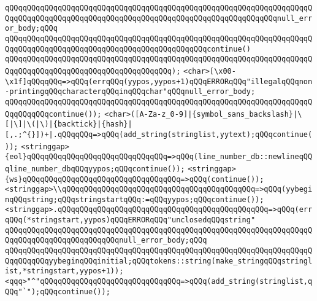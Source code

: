 \verb|qQQqqQQqqQQqqQQqqQQqqQQqqQQqqQQqqQQqqQQqqQQqqQQqqQQqqQQqqQQqqQQqqQQqqQQqqQQqqQQqqQQqqQQqqQQqqQQqqQQqqQQqqQQqqQQqqQQqqQQqqQQqqQQqqQQqnull_error_body;qQQq|\newline
\verb|qQQqqQQqqQQqqQQqqQQqqQQqqQQqqQQqqQQqqQQqqQQqqQQqqQQqqQQqqQQqqQQqqQQqqQQqqQQqqQQqqQQqqQQqqQQqqQQqqQQqqQQqqQQqqQQqqQQqcontinue()|\newline
\verb|qQQqqQQqqQQqqQQqqQQqqQQqqQQqqQQqqQQqqQQqqQQqqQQqqQQqqQQqqQQqqQQqqQQqqQQqqQQqqQQqqQQqqQQqqQQqqQQqqQQqqQQqqQQq);|\newline
\newline
\newline
\verb|<char>[\x00-\x1f]qQQqqQQq=>qQQq(errqQQq(yypos,yypos+1)qQQqERRORqQQq"illegalqQQqnon-printingqQQqcharacterqQQqinqQQqchar"qQQqnull_error_body;|\newline
\verb|qQQqqQQqqQQqqQQqqQQqqQQqqQQqqQQqqQQqqQQqqQQqqQQqqQQqqQQqqQQqqQQqqQQqqQQqqQQqqQQqcontinue());|\newline
\verb|<char>([A-Za-z_0-9]|\verb#|{symbol_sans_backslash}|\[|\]|\(|\)|{backtick}|{hash}|[,.;^{}])+|.qQQqqQQq=>qQQq(add_string(stringlist,yytext);qQQqcontinue());#\newline
\newline
\newline
\verb|<stringgap>{eol}qQQqqQQqqQQqqQQqqQQqqQQqqQQqqQQq=>qQQq(line_number_db::newlineqQQqline_number_dbqQQqyypos;qQQqcontinue());|\newline
\verb|<stringgap>{ws}qQQqqQQqqQQqqQQqqQQqqQQqqQQqqQQqqQQq=>qQQq(continue());|\newline
\verb|<stringgap>\\qQQqqQQqqQQqqQQqqQQqqQQqqQQqqQQqqQQqqQQqqQQq=>qQQq(yybeginqQQqstring;qQQqstringstartqQQq:=qQQqyypos;qQQqcontinue());|\newline
\verb|<stringgap>.qQQqqQQqqQQqqQQqqQQqqQQqqQQqqQQqqQQqqQQqqQQqqQQq=>qQQq(errqQQq(*stringstart,yypos)qQQqERRORqQQq"unclosedqQQqstring"|\newline
\verb|qQQqqQQqqQQqqQQqqQQqqQQqqQQqqQQqqQQqqQQqqQQqqQQqqQQqqQQqqQQqqQQqqQQqqQQqqQQqqQQqqQQqqQQqqQQqqQQqnull_error_body;qQQq|\newline
\verb|qQQqqQQqqQQqqQQqqQQqqQQqqQQqqQQqqQQqqQQqqQQqqQQqqQQqqQQqqQQqqQQqqQQqqQQqqQQqqQQqyybeginqQQqinitial;qQQqtokens::string(make_stringqQQqstringlist,*stringstart,yypos+1));|\newline
\newline
\verb|<qqq>"^"qQQqqQQqqQQqqQQqqQQqqQQqqQQqqQQq=>qQQq(add_string(stringlist,qQQq"`");qQQqcontinue());|\newline
